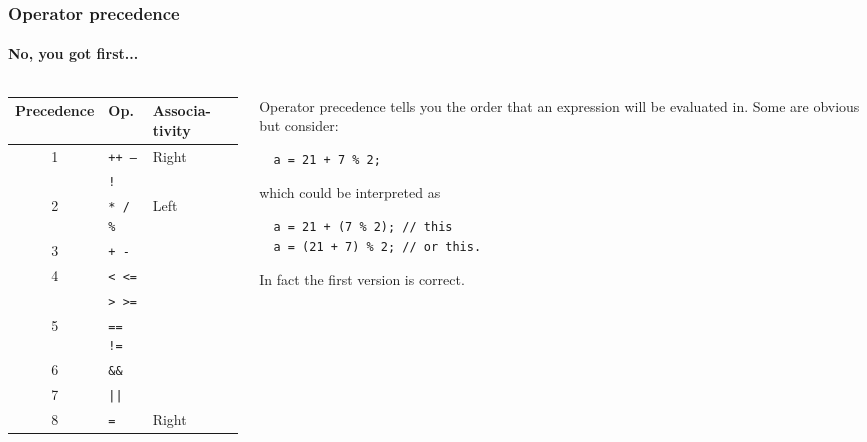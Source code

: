 \documentclass{beamer}
\begin{document}
\begin{frame}[fragile]
  \frametitle{Operator precedence}
  \framesubtitle{No, you got first...}
  \begin{columns}[t]
	  \begin{column}[T]{0.44\textwidth}
		  \begin{tabular}{c|l|m{1.2cm}}
			  Precedence & Op. & Associa-
			  tivity \\
			  \hline
			  \multirow{2}{*}{1} & \texttt{++ --} & \multirow{2}{*}{Right}\\
			    & \texttt{!} \\
			  \hline
			  2 & \texttt{* / \%} & \multirow{6}{*}{Left} \\
			  \cline{1-2}
			  3 & \texttt{+ -} & \\
			  \cline{1-2}
			  \multirow{2}{*}{4} & \texttt{< <=} \\
			    & \texttt{> >=} \\
			  \cline{1-2}
			  5 & \texttt{== !=} \\
			  \cline{1-2}
			  6 & \texttt{\&\&} \\
			  \cline{1-2}
			  7 & \texttt{||} \\
			  \hline
			  8 & \texttt{=} & Right
		  \end{tabular}
	 	\end{column}
  	\begin{column}[T]{0.518\textwidth}
	  Operator precedence tells you the order that an expression will be evaluated in.  Some are obvious but consider:
	  \begin{lstlisting}
  a = 21 + 7 % 2;
	  \end{lstlisting}
    which could be interpreted as
	  \begin{lstlisting}
  a = 21 + (7 % 2); // this
  a = (21 + 7) % 2; // or this.
	  \end{lstlisting}
	  In fact the first version is correct.
	  \pause
  	\end{column}
 	\end{columns}
\end{frame}
\end{document}
